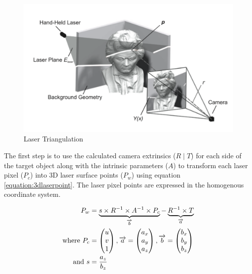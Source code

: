\begin{figure}[ht!]
\centering
\includegraphics[width=0.9\linewidth]{figures/pointcloudpaper}
\caption{Laser Triangulation \cite{winkelbach:2006}}
\label{figure:triangulation}
\end{figure}

The first step is to use the calculated camera extrinsics ($R \mid T$) for each side of the target object along with the intrinsic parameters ($A$) to transform each laser pixel ($P_c$) into 3D laser surface points ($P_w$) using equation \ref{equation:3dlaserpoint}. The laser pixel points are expressed in the homogenous coordinate system. 

\begin{align}
	\label{equation:3dlaserpoint}				
	P_w &= 	\underbrace{s \times R^{-1} 
 					 							\times A^{-1}
 												\times P_c
										 }_\text{$\overrightarrow{b}$}
					- 
					\underbrace{
											R^{-1} \times T					
										 }_\text{$\overrightarrow{a}$} \\
	\text{where}~
	P_c &= \begin{pmatrix}
						u \\ 
						v \\
						1 \\
				 \end{pmatrix}, 
	\overrightarrow{a} = \begin{pmatrix}
													a_x \\
													a_y \\
													a_z \\
												\end{pmatrix}, 
	\overrightarrow{b} = \begin{pmatrix}
													b_x \\
													b_y \\
													b_z \\
												\end{pmatrix} \notag \\ 
  \text{and}~ s &= \frac{a_z}{b_z} \notag
\end{align}

